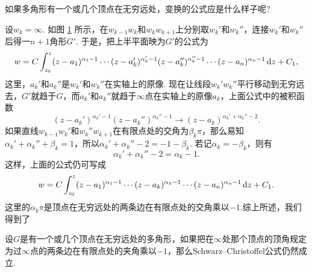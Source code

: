 如果多角形有一个或几个顶点在无穷远处，变换的公式应是什么样子呢?
\begin{figure}[!ht]
  \centering
  \caption{\label{fig7.7}}
\end{figure}

  设$w_k=\infty$. 如图 \ref{fig7.7} 所示，在$w_{k-1}w_k$和$w_kw_{k+1}$上分别取$w_k'$和$w_k''$，连接$w_k'$和$w_k''$后得一$n+1$角形$G'$. 于是，把上半平面映为$G'$的公式为
  \[
    w = C\int_{z_0}^z(z-a_1)^{\alpha_1-1}\cdots(z-a_k')^{\alpha_k'-1}(z-a_k'')^{\alpha_k''-1}
    \cdots(z-a_n)^{\alpha_n-1}\mathop{}\!\mathrm dz+C_1,
  \]
  这里，$a_k'$和$a_k''$是$w_k'$和$w_k''$在实轴上的原像. 现在让线段$w_k'w_k''$平行移动到无穷远去，$G'$就趋于$G$，而$a_k'$和$a_k''$就趋于$\infty$点在实轴上的原像$a_k$，上面公式中的被积函数
  \[
    (z-a_k')^{\alpha_k'-1}(z-a_k'')^{\alpha_k''-1}\to(z-a_k)^{\alpha_k'+\alpha_k''-2}.
  \]
  如果直线$w_{k-1}w_k'$和$w_k''w_{k+1}$在有限点处的交角为$\beta_k\pi$，那么易知$\alpha_k'+\alpha_k''+\beta_k=1$，所以$\alpha_k'+\alpha_k''-2=-1-\beta_k$. 若记$\alpha_k=-\beta_k$，则有
  \[
    \alpha_k' + \alpha_k'' - 2 = \alpha_k - 1.
  \]
  这样，上面的公式仍可写成
  \[
    w = C\int_{z_0}^z(z-a_1)^{\alpha_1-1}\cdots(z-a_k)^{\alpha_k-1}\cdots(z-a_n)^{\alpha_n-1}
    \mathop{}\!\mathrm dz+C_1.
  \]
  这里的$\alpha_k\pi$是顶点在无穷远处的两条边在有限点处的交角乘以$-1$.综上所述，我们得到了
\begin{theorem}\label{thm7.4.6}
  设$G$是有一个或几个顶点在无穷远处的多角形，如果把在$\infty$处那个顶点的顶角规定为过$\infty$点的两条边在有限点处的夹角乘以$-1$，那么Schwarz--Christoffel公式仍然成立.
\end{theorem}

